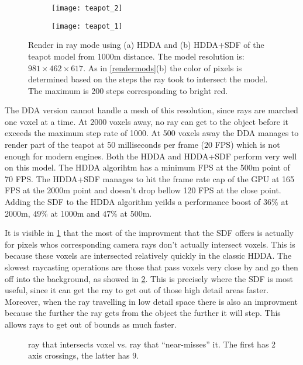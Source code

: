 \begin{figure}[H]
  \centering
  \begin{subfigure}[b]{0.48\textwidth}
    \texttt{[image: teapot\_2]}
    \caption{}
  \end{subfigure}
  \hfill
  \begin{subfigure}[b]{0.48\textwidth}
    \texttt{[image: teapot\_1]}
    \caption{}
  \end{subfigure}
  \caption{Render in ray mode using (a) HDDA and (b) HDDA+SDF of the teapot model from 1000m distance. The model resolution is: $981\times462\times617$. As in \cref{rendermods}(b) the color of pixels is determined based on the steps the ray took to intersect the model. The maximum is 200 steps corresponding to bright red.}
  \label{teacomp}
\end{figure}

The DDA version cannot handle a mesh of this resolution, since rays are marched one voxel at a time. At 2000 voxels away, no ray can get to the object before it exceeds the maximum step rate of 1000. At 500 voxels away the DDA manages to render part of the teapot at 50 milliseconds per frame ($20$ FPS) which is not enough for modern engines.
Both the HDDA and HDDA+SDF perform very well on this model. The HDDA algorihtm has a minimum FPS at the 500m point of 70 FPS. The HDDA+SDF manages to hit the frame rate cap of the GPU at 165 FPS at the 2000m point and doesn't drop bellow 120 FPS at the close point. Adding the SDF to the HDDA algorithm yeilds a performance boost of $36\%$ at 2000m, $49\%$ at 1000m and $47\%$ at 500m.

It is visible in \cref{teacomp} that the most of the improvment that the SDF offers is actually for pixels whos corresponding camera rays don't actually intersect voxels. This is because these voxels are intersected relatively quickly in the classic HDDA. The slowest raycasting operations are those that pass voxels very close by and go then off  into the background, as showed in \cref{steps}. This is precisely where the SDF is most useful, since it can get the ray to get out of those high detail areas faster. Moreover, when the ray travelling in low detail space there is also an improvment because the further the ray gets from the object the further it will step. This allows rays to get out of bounds as much faster.

\begin{figure}[H]
  \centering
  
  \caption{ray that intersects voxel vs. ray that ``near-misses'' it. The first has 2 axis crossings, the latter has 9.}
  \label{steps}
\end{figure}

